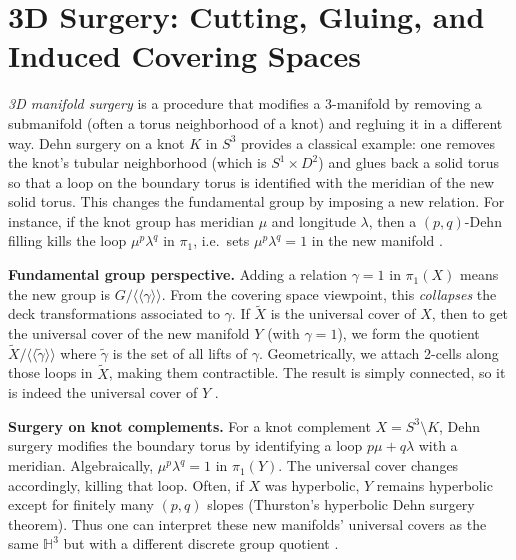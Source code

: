 \documentclass[11pt]{article}
\theoremstyle{remark}
\begin{document}
    \bigskip

    \section{3D Surgery: Cutting, Gluing, and Induced Covering Spaces}
    \label{sec:3d-surgery}

    \emph{3D manifold surgery} is a procedure that modifies a 3-manifold by removing a submanifold (often a torus neighborhood of a knot) and regluing it in a different way. Dehn surgery on a knot $K$ in $S^3$ provides a classical example: one removes the knot's tubular neighborhood (which is $S^1\times D^2$) and glues back a solid torus so that a loop on the boundary torus is identified with the meridian of the new solid torus. This changes the fundamental group by imposing a new relation. For instance, if the knot group has meridian $\mu$ and longitude $\lambda$, then a $(p,q)$-Dehn filling kills the loop $\mu^p\lambda^q$ in $\pi_1$, i.e.\ sets $\mu^p\lambda^q=1$ in the new manifold \cite[{[16\,\textdagger L173-L181]}]{somebib}.

    \medskip

    {\bf Fundamental group perspective.} Adding a relation $\gamma=1$ in $\pi_1(X)$ means the new group is $G/\langle\!\langle \gamma\rangle\!\rangle$. From the covering space viewpoint, this \emph{collapses} the deck transformations associated to $\gamma$. If $\widetilde{X}$ is the universal cover of $X$, then to get the universal cover of the new manifold $Y$ (with $\gamma=1$), we form the quotient $\widetilde{X}/\langle\!\langle \widetilde{\gamma}\rangle\!\rangle$ where $\widetilde{\gamma}$ is the set of all lifts of $\gamma$. Geometrically, we attach 2-cells along those loops in $\widetilde{X}$, making them contractible. The result is simply connected, so it is indeed the universal cover of $Y$ \cite[{[10\,\textdagger L773-L781, 44\,\textdagger L1-L4]}]{somebib}.

    \medskip

    {\bf Surgery on knot complements.} For a knot complement $X=S^3\setminus K$, Dehn surgery modifies the boundary torus by identifying a loop $p\mu + q\lambda$ with a meridian. Algebraically, $\mu^p\lambda^q=1$ in $\pi_1(Y)$. The universal cover changes accordingly, killing that loop. Often, if $X$ was hyperbolic, $Y$ remains hyperbolic except for finitely many $(p,q)$ slopes (Thurston's hyperbolic Dehn surgery theorem). Thus one can interpret these new manifolds' universal covers as the same $\mathbb{H}^3$ but with a different discrete group quotient \cite[{[16\,\textdagger L181-L186]}]{somebib}.
\end{document}

